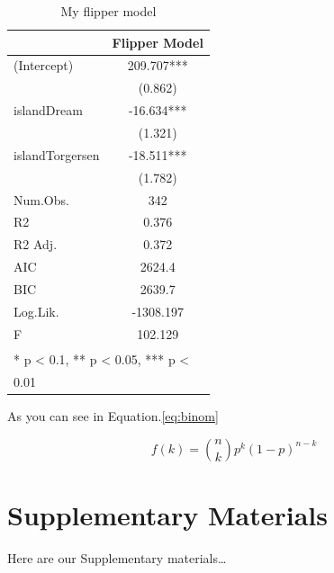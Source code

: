 \documentclass[
]{article}
\begin{document}
\begin{table}

\caption{\label{tab:flipper-model}My flipper model}
\centering
\begin{tabular}[t]{lc}
\toprule
  & Flipper Model\\
\midrule
(Intercept) & 209.707***\\
 & (0.862)\\
islandDream & -16.634***\\
 & (1.321)\\
islandTorgersen & -18.511***\\
 & (1.782)\\
\midrule
Num.Obs. & 342\\
R2 & 0.376\\
R2 Adj. & 0.372\\
AIC & 2624.4\\
BIC & 2639.7\\
Log.Lik. & -1308.197\\
F & 102.129\\
\bottomrule
\multicolumn{2}{l}{\textsuperscript{} * p < 0.1, ** p < 0.05, *** p <}\\
\multicolumn{2}{l}{0.01}\\
\end{tabular}
\end{table}

As you can see in Equation.\eqref{eq:binom}

\begin{equation} 
  f\left(k\right) = \binom{n}{k} p^k\left(1-p\right)^{n-k}
  \label{eq:binom}
\end{equation}

\newpage

\hypertarget{supplementary-materials}{%
\section{Supplementary Materials}\label{supplementary-materials}}

\renewcommand{\thefigure}{S\arabic{figure}}

\setcounter{figure}{0}

\renewcommand{\thetable}{S\arabic{table}}

\setcounter{table}{0}

\renewcommand{\theequation}{S\arabic{equation}}

\setcounter{equation}{0}

Here are our Supplementary materials\ldots{}
\end{document}
